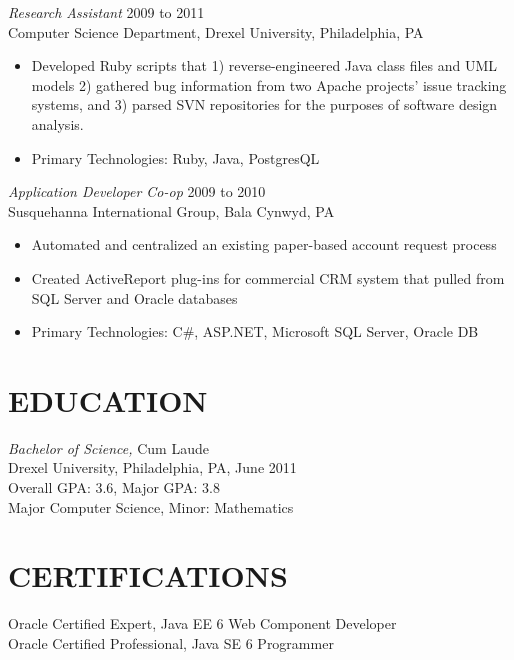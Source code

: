 \documentclass[line,margin]{res}
\begin{document}
\begin{resume}
{\sl Research Assistant} \hfill            2009 to 2011 \\
Computer Science Department, Drexel University, Philadelphia, PA
\begin{itemize}  \itemsep -2pt %
\item Developed Ruby scripts that 1) reverse-engineered Java class files and UML models 2) gathered bug information from two Apache projects’ issue tracking systems, and 3) parsed SVN repositories for the purposes of software design analysis.
\item Primary Technologies: Ruby, Java, PostgresQL
\end{itemize}

{\sl Application Developer Co-op} \hfill        2009 to 2010 \\
Susquehanna International Group, Bala Cynwyd, PA
\begin{itemize}  \itemsep -2pt %
\item Automated and centralized an existing paper-based account request process
\item Created ActiveReport plug-ins for commercial CRM system that pulled from SQL Server and Oracle databases
\item Primary Technologies: C\#, ASP.NET, Microsoft SQL Server, Oracle DB
\end{itemize}

\section{EDUCATION}
{\sl Bachelor of Science,} Cum Laude \\
Drexel University, Philadelphia, PA,
June 2011 \\
Overall GPA: 3.6, Major GPA: 3.8 \\
Major Computer Science, Minor: Mathematics

\section{CERTIFICATIONS}
Oracle Certified Expert, Java EE 6 Web Component Developer \\
Oracle Certified Professional, Java SE 6 Programmer

\end{resume}
\end{document}
